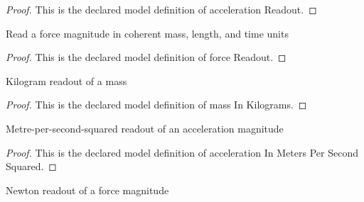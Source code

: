 \begin{proof}
  This is the declared model definition of acceleration Readout.
\end{proof}
\begin{definition}
  \label{def:physics:phyx-mini-0761:phyxminiproblems-problemphyxmini0761-forcereadout}
  Read a force magnitude in coherent mass, length, and time units
\end{definition}
\begin{proof}
  This is the declared model definition of force Readout.
\end{proof}
\begin{definition}
  \label{def:physics:phyx-mini-0761:phyxminiproblems-problemphyxmini0761-massinkilograms}
  Kilogram readout of a mass
\end{definition}
\begin{proof}
  This is the declared model definition of mass In Kilograms.
\end{proof}
\begin{definition}
  \label{def:physics:phyx-mini-0761:phyxminiproblems-problemphyxmini0761-accelerationinmeterspersecondsquared}
  Metre-per-second-squared readout of an acceleration magnitude
\end{definition}
\begin{proof}
  This is the declared model definition of acceleration In Meters Per Second Squared.
\end{proof}
\begin{definition}
  \label{def:physics:phyx-mini-0761:phyxminiproblems-problemphyxmini0761-forceinnewtons}
  Newton readout of a force magnitude
\end{definition}
